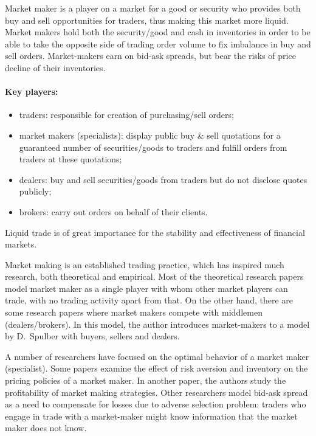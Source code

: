 \documentclass{article}
\begin{document}
\begin{multicols}{2}
Market maker is a player on a market for a good or security who provides both buy and sell opportunities for traders, thus making this market more liquid. Market makers hold both the security/good and cash in inventories in order to be able to take the opposite side of trading order volume to fix imbalance in buy and sell orders. Market-makers earn on bid-ask spreads, but bear the risks of price decline of their inventories.
 
\paragraph*{Key players:}

\begin{itemize}
\item traders: responsible for creation of purchasing/sell orders;
\item market makers (specialists): display public buy \& sell quotations for a guaranteed number of securities/goods to traders and fulfill orders from traders at these quotations;
\item dealers: buy and sell securities/goods from traders but do not disclose quotes publicly;
\item brokers: carry out orders on behalf of their clients.
\end{itemize}
 
Liquid trade is of great importance for the stability and effectiveness of financial markets. 
 
Market making is an established trading practice, which has inspired much research, both theoretical and empirical. Most of the theoretical research papers model market maker as a single player with whom other market players can trade, with no trading activity apart from that. On the other hand, there are some research papers where market makers compete with middlemen (dealers/brokers). In this model, the author introduces market-makers to a model by D.~Spulber with buyers, sellers and dealers.

A number of researchers have focused on the optimal behavior of a market maker (specialist). Some papers examine the effect of risk aversion and inventory on the pricing policies of a market maker. In another paper, the authors study the profitability of market making strategies.
Other researchers model bid-ask spread as a need to compensate for losses due to adverse selection problem: traders who engage in trade with a market-maker might know information that the market maker does not know.


\end{multicols}
\end{document}
